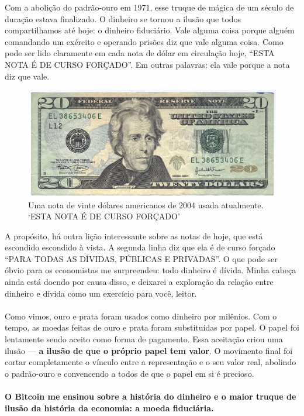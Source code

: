 Com a abolição do padrão-ouro em 1971, esse truque de mágica de um século de duração estava finalizado. O dinheiro se tornou a ilusão que todos compartilhamos até hoje: o dinheiro fiduciário. Vale alguma coisa porque alguém comandando um exército e operando prisões diz que vale alguma coisa. Como pode ser lido claramente em cada nota de dólar em circulação hoje, \enquote{ESTA NOTA É DE CURSO FORÇADO}. Em outras palavras: ela vale porque a nota diz que vale.

\begin{figure}
  \centering
  \includegraphics{assets/images/us-dollar-2004.jpg}
  \caption{Uma nota de vinte dólares americanos de 2004 usada atualmente. `ESTA NOTA É DE CURSO FORÇADO'}
  \label{fig:us-dollar-2004}
\end{figure}

A propósito, há outra lição interessante sobre as notas de hoje, que está escondido escondido à vista. A segunda linha diz que ela é de curso forçado \enquote{PARA TODAS AS DÍVIDAS, PÚBLICAS E PRIVADAS}. O que pode ser óbvio para os economistas me surpreendeu: todo dinheiro é dívida. Minha cabeça ainda está doendo por causa disso, e deixarei a exploração da relação entre dinheiro e dívida como um exercício para você, leitor.

\paragraph{}
Como vimos, ouro e prata foram usados como dinheiro por milênios. Com o tempo, as moedas feitas de ouro e prata foram substituídas por papel. O papel foi lentamente sendo aceito como forma de pagamento. Essa aceitação criou uma ilusão --- \textbf{a ilusão de que o próprio papel tem valor}. O movimento final foi cortar completamente o vínculo entre a representação e o seu valor real, abolindo o padrão-ouro e convencendo a todos de que o papel em si é precioso.

\paragraph{O Bitcoin me ensinou sobre a história do dinheiro e o maior truque de ilusão da história da economia: a moeda fiduciária.}

